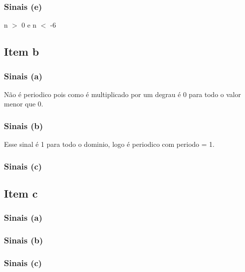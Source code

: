 \documentclass[a4paper, 12pt]{article}
\begin{document}
            \subsubsection{Sinais (e)}
            n $>$ 0 e n $<$ -6
        \subsection{Item b}
            \subsubsection{Sinais (a)}
            N\~ao \'e periodico pois como \'e multiplicado por um degrau \'e 0 para todo o valor menor que 0.
            \subsubsection{Sinais (b)}
            Esse sinal \'e 1 para todo o dominio, logo \'e periodico com periodo = 1.
            \subsubsection{Sinais (c)}
        \subsection{Item c}
            \subsubsection{Sinais (a)}
            \subsubsection{Sinais (b)}
            \subsubsection{Sinais (c)}
\end{document}
